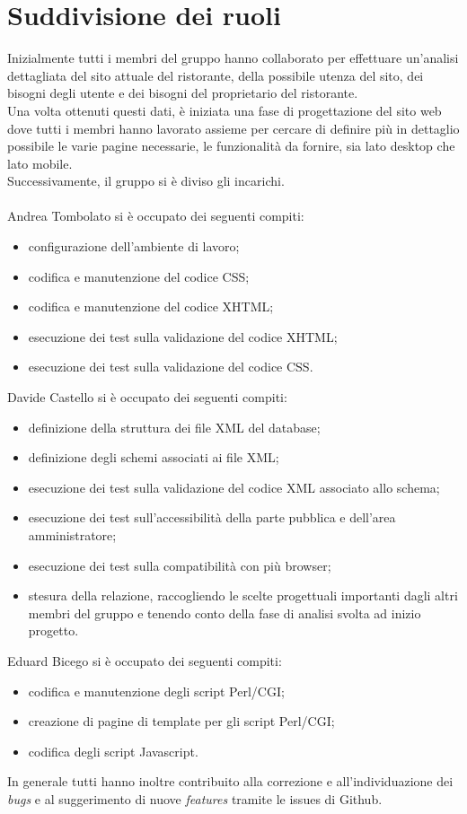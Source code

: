 \documentclass[../relazione.tex]{subfiles}
\begin{document}
\section{Suddivisione dei ruoli}
	Inizialmente tutti i membri del gruppo hanno collaborato per effettuare un'analisi dettagliata del sito attuale del ristorante, della possibile utenza del sito, dei bisogni degli utente e dei bisogni del proprietario del ristorante.\\
	Una volta ottenuti questi dati, è iniziata una fase di progettazione del sito web dove tutti i membri hanno lavorato assieme per cercare di definire più in dettaglio possibile le varie pagine necessarie, le funzionalità da fornire, sia lato desktop che lato mobile.\\
	Successivamente, il gruppo si è diviso gli incarichi.
	\\\\Andrea Tombolato si è occupato dei seguenti compiti:
	\begin{itemize}
		\item configurazione dell’ambiente di lavoro;
		\item codifica e manutenzione del codice CSS;
		\item codifica e manutenzione del codice XHTML;
		\item esecuzione dei test sulla validazione del codice XHTML;
		\item esecuzione dei test sulla validazione del codice CSS.
	\end{itemize}
	Davide Castello si è occupato dei seguenti compiti:
	\begin{itemize}
		\item definizione della struttura dei file XML del database;
		\item definizione degli schemi associati ai file XML;
		\item esecuzione dei test sulla validazione del codice XML associato allo schema;
		\item esecuzione dei test sull’accessibilità della parte pubblica e dell'area amministratore;
		\item esecuzione dei test sulla compatibilità con più browser;
		\item stesura della relazione, raccogliendo le scelte progettuali importanti dagli altri membri del gruppo e tenendo conto della fase di analisi svolta ad inizio progetto.
	\end{itemize}
	Eduard Bicego si è occupato dei seguenti compiti:
	\begin{itemize}
		\item codifica e manutenzione degli script Perl/CGI;
		\item creazione di pagine di template per gli script Perl/CGI;
		\item codifica degli script Javascript.
	\end{itemize}
	In generale tutti hanno inoltre contribuito alla correzione e all’individuazione dei \textit{bugs} e al suggerimento di nuove \textit{features} tramite le issues di Github.
\end{document}
